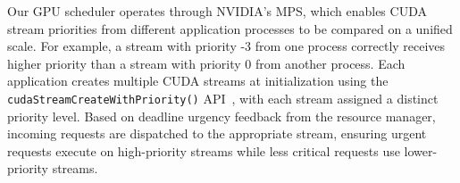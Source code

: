 Our GPU scheduler operates through NVIDIA's MPS, which enables CUDA stream priorities from different application processes to be compared on a unified scale.
For example, a stream with priority -3 from one process correctly receives higher priority than a stream with priority 0 from another process.
Each application creates multiple CUDA streams at initialization using the \texttt{cudaStreamCreateWithPriority()} API~\cite{cuda-stream-priority}, with each stream assigned a distinct priority level.
Based on deadline urgency feedback from the resource manager, incoming requests are dispatched to the appropriate stream, ensuring urgent requests execute on high-priority streams while less critical requests use lower-priority streams.
